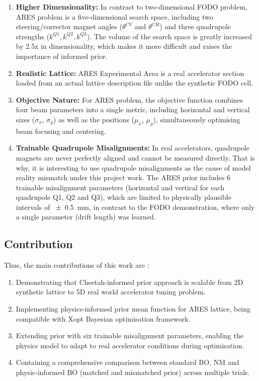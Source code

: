 \begin{enumerate}
    \item \textbf{Higher Dimensionality:} In contrast to two-dimensional FODO problem, ARES problem is a five-dimensional search space, including two steering/corrector magnet angles ($\theta^{CV}$ and $\theta^{CH}$) and three quadrupole strengths ($k^{Q1},k^{Q2}, k^{Q3}$). The volume of the search space is greatly increased by 2.5x in dimensionality, which makes it more difficult and raises the importance of informed prior. 
    \item \textbf{Realistic Lattice:} ARES Experimental Area is a real accelerator section loaded from an actual lattice description file unlike the synthetic FODO cell. 
    \item \textbf{Objective Nature:} For ARES problem, the objective function combines four beam parameters into a single metric, including horizontal and vertical sizes ($\sigma_x$, $\sigma_y$) as well as the positions ($\mu_x$, $\mu_y$), simultaneously optimising beam focusing and centering.
    \item \textbf{Trainable Quadrupole Misalignments:} In real accelerators, quadrupole magnets are never perfectly aligned and cannot be measured directly. That is why, it is interesting to use quadrupole misalignments as the cause of model reality mismatch under this project work. The ARES prior includes 6 trainable misalignment parameters (horizontal and vertical for each quadrupole Q1, Q2 and Q3), which are limited to physically plausible intervals of \SI{\pm 0.5}{mm}, in contrast to the FODO demonstration, where only a single parameter (drift length) was learned.
\end{enumerate}


\subsection{Contribution}

Thus, the main contributions of this work are : \

\begin{enumerate}
    \item Demonstrating that Cheetah-informed prior approach is scalable from 2D synthetic lattice to 5D real world accelerator tuning problem. 
    \item Implementing physics-informed prior mean function for ARES lattice, being compatible with Xopt Bayesian optimisation framework.
    \item Extending prior with six trainable misalignment parameters, enabling the physics model to adapt to real accelerator conditions during optimisation.
    \item Containing a comprehensive comparison between standard BO, NM and physic-informed BO (matched and mismatched prior) across multiple trials.
\end{enumerate}